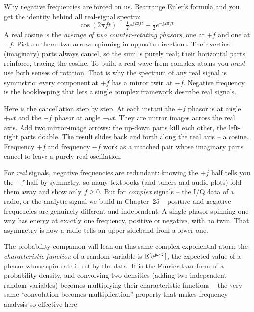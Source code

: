 \begin{whybox}
Why negative frequencies are forced on us. Rearrange Euler's formula and you get the
identity behind all real-signal spectra:
\[
  \cos(2\pi f t) = \tfrac12 e^{\jj 2\pi f t} + \tfrac12 e^{-\jj 2\pi f t}.
\]
A real cosine is the \emph{average of two counter-rotating phasors}, one at $+f$ and
one at $-f$. Picture them: two arrows spinning in opposite directions. Their vertical
(imaginary) parts always cancel, so the sum is purely real; their horizontal parts
reinforce, tracing the cosine. To build a real wave from complex atoms you
\emph{must} use both senses of rotation. That is why the spectrum of any real signal
is symmetric: every component at $+f$ has a mirror twin at $-f$. Negative frequency
is the bookkeeping that lets a single complex framework
describe real signals.
\end{whybox}

\begin{happeningbox}
Here is the cancellation step by step. At each instant the $+f$ phasor is at angle
$+\omega t$ and the $-f$ phasor at angle $-\omega t$. They are mirror images across
the real axis. Add two mirror-image arrows: the up-down parts kill each other, the
left-right parts double. The result slides back and forth along the real axis -- a
cosine. Frequency $+f$ and frequency $-f$ work as a matched pair whose imaginary
parts cancel to leave a purely real oscillation.
\end{happeningbox}

\begin{focusbox}
For \emph{real} signals, negative frequencies are redundant: knowing the $+f$ half
tells you the $-f$ half by symmetry, so many textbooks (and tuners and audio plots)
fold them away and show only $f \ge 0$. But for \emph{complex} signals -- the
I/Q data of a radio, or the analytic signal we build in Chapter~25 -- positive and
negative frequencies are genuinely different and independent. A single phasor
spinning one way has energy at exactly one frequency, positive or negative, with no
twin. That asymmetry is how a radio tells an upper sideband from a
lower one.
\end{focusbox}

\begin{connectionbox}
The probability companion will lean on this same complex-exponential atom: the
\emph{characteristic function} of a random variable is $\operatorname{\mathbb{E}}[e^{\mathrm{j}\omega X}]$, the
expected value of a phasor whose spin rate is set by the data. It is the Fourier
transform of a probability density, and convolving two densities (adding two
independent random variables) becomes multiplying their characteristic functions --
the very same ``convolution becomes multiplication'' property that makes frequency
analysis so effective here.
\end{connectionbox}

